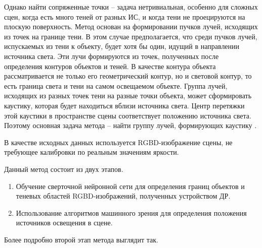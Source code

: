 Однако найти сопряженные точки -- задача нетривиальная, особенно для сложных сцен, когда есть много теней от разных ИС, и когда тени не проецируются на плоскую поверхность. Метод основан на формировании пучков лучей, исходящих из точек на границе тени. В этом случае предполагается, что среди пучков лучей, испускаемых из тени к объекту, будет хотя бы один, идущий в направлении источника света. Эти лучи формируются из точек, полученных после определения контуров объектов и теней. В качестве контура объекта рассматривается не только его геометрический контур, но и световой контур, то есть граница света и тени на самом освещаемом объекте. Группа лучей, исходящих из разных точек тени на разные точки объекта, может сформировать каустику, которая будет находиться вблизи источника света. Центр перетяжки этой каустики в пространстве сцены соответствует положению источника света. Поэтому основная задача метода -- найти группу лучей, формирующих каустику \cite{sns_tras}.

В качестве исходных данных используется RGBD-изображение сцены, не требующее калибровки по реальным значениям яркости.

Данный метод состоит из двух этапов.
\begin{enumerate}
	\item Обучение сверточной нейронной сети для определения границ объектов и теневых областей RGBD-изображений, полученных устройством ДР.
	\item Использование алгоритмов машинного зрения для определения положения источников освещения в сцене.
\end{enumerate}

Более подробно второй этап метода выглядит так.

